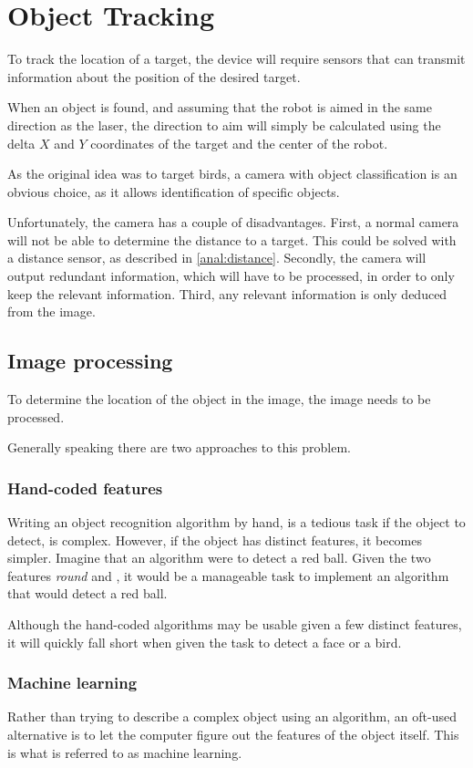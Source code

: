 \section{Object Tracking}
\label{sec:obj_tracking}
To track the location of a target, the device will require sensors that can transmit information about the position of the desired target.


When an object is found, and assuming that the robot is aimed in the same direction as the laser, the direction to aim will simply be calculated using the delta $X$ and $Y$ coordinates of the target and the center of the robot.

As the original idea was to target birds, a camera with object classification is an obvious choice, as it allows identification of specific objects.


Unfortunately, the camera has a couple of disadvantages.
First, a normal camera will not be able to determine the distance to a target.
This could be solved with a distance sensor, as described in \autoref{anal:distance}.
Secondly, the camera will output redundant information, which will have to be processed, in order to only keep the relevant information.
Third, any relevant information is only deduced from the image. 

\subsection{Image processing}
To determine the location of the object in the image, the image needs to be processed.

Generally speaking there are two approaches to this problem.
\subsubsection{Hand-coded features}
Writing an object recognition algorithm by hand, is a tedious task if the object to detect, is complex.
However, if the object has distinct features, it becomes simpler.
Imagine that an algorithm were to detect a red ball. 
Given the two features \textit{round} and , it would be a manageable task to implement an algorithm that would detect a red ball.

Although the hand-coded algorithms may be usable given a few distinct features, it will quickly fall short when given the task to detect a face or a bird.

\subsubsection{Machine learning}\label{sec:obj_tracking:sub:ML}
Rather than trying to describe a complex object using an algorithm, an oft-used alternative is to let the computer figure out the features of the object itself.
This is what is referred to as machine learning.

